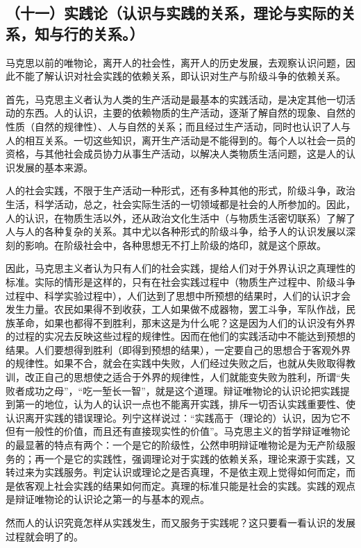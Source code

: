 \subsection{（十一）实践论（认识与实践的关系，理论与实际的关系，知与行的关系。）}

马克思以前的唯物论，离开人的社会性，离开人的历史发展，去观察认识问题，因此不能了解认识对社会实践的依赖关系，即认识对生产与阶级斗争的依赖关系。

首先，马克思主义者认为人类的生产活动是最基本的实践活动，是决定其他一切活动的东西。人的认识，主要的依赖物质的生产活动，逐渐了解自然的现象、自然的性质（自然的规律性）、人与自然的关系；而且经过生产活动，同时也认识了人与人的相互关系。一切这些知识，离开生产活动是不能得到的。每个人以社会一员的资格，与其他社会成员协力从事生产活动，以解决人类物质生活问题，这是人的认识发展的基本来源。

人的社会实践，不限于生产活动一种形式，还有多种其他的形式，阶级斗争，政治生活，科学活动，总之，社会实际生活的一切领域都是社会的人所参加的。因此，人的认识，在物质生活以外，还从政治文化生活中（与物质生活密切联系）了解了人与人的各种复杂的关系。其中尤以各种形式的阶级斗争，给予人的认识发展以深刻的影响。在阶级社会中，各种思想无不打上阶级的烙印，就是这个原故。

因此，马克思主义者认为只有人们的社会实践，提给人们对于外界认识之真理性的标准。实际的情形是这样的，只有在社会实践过程中（物质生产过程中、阶级斗争过程中、科学实验过程中），人们达到了思想中所预想的结果时，人们的认识才会发生力量。农民如果得不到收获，工人如果做不成器物，罢工斗争，军队作战，民族革命，如果也都得不到胜利，那末这是为什么呢？这是因为人们的认识没有外界的过程的实况去反映这些过程的规律性。因而在他们的实践活动中不能达到预想的结果。人们要想得到胜利（即得到预想的结果），一定要自己的思想合于客观外界的规律性。如果不合，就会在实践中失败，人们经过失败之后，也就从失败取得教训，改正自己的思想使之适合于外界的规律性，人们就能变失败为胜利，所谓“失败者成功之母”，“吃一堑长一智”，就是这个道理。辩证唯物论的认识论把实践提到第一的地位，认为人的认识一点也不能离开实践，排斥一切否认实践重要性、使认识离开实践的错误理论。列宁这样说过：“实践高于（理论的）认识，因为它不但有一般性的价值，而且还有直接现实性的价值”。马克思主义的哲学辩证唯物论的最显著的特点有两个：一个是它的阶级性，公然申明辩证唯物论是为无产阶级服务的；再一个是它的实践性，强调理论对于实践的依赖关系，理论来源于实践，又转过来为实践服务。判定认识或理论之是否真理，不是依主观上觉得如何而定，而是依客观上社会实践的结果如何而定。真理的标准只能是社会的实践。实践的观点是辩证唯物论的认识论之第一的与基本的观点。

然而人的认识究竟怎样从实践发生，而又服务于实践呢？这只要看一看认识的发展过程就会明了的。

